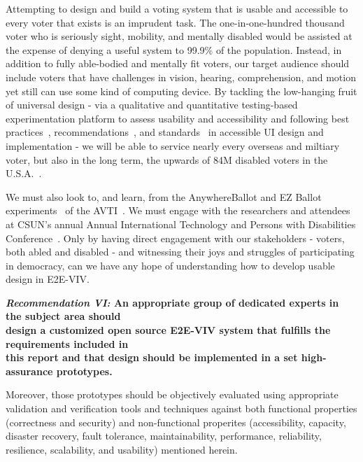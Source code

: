 Attempting to design and build a voting system that is usable and
accessible to every voter that exists is an imprudent task. The
one-in-one-hundred thousand voter who is seriously sight, mobility, and
mentally disabled would be assisted at the expense of 
denying a useful system to 99.9\% of the population. 
Instead, in addition to fully
able-bodied and mentally fit voters, our target audience should include voters that have challenges in
vision, hearing, comprehension, and motion yet still can use some
kind of computing device. By tackling the low-hanging fruit of
universal design - via a qualitative and quantitative testing-based
experimentation platform to assess usability and accessibility and
following best practices~\cite{materials-at-elections.itif.org},
recommendations~\cite{WAI,Section508,WAVE}, and
standards~\cite{standards} in accessible UI design and
implementation - we will be able to service nearly every
overseas and miltiary voter, but also in the long term, the upwards of 84M disabled
voters in the U.S.A.~\cite{Brennen,CensusData}. 

We must also look to, and learn, from the AnywhereBallot and
EZ Ballot experiments~\cite{AnywhereBallot,EZBallot} of the
AVTI~\cite{AVTI}.  We must engage with the researchers and attendees
at CSUN's annual Annual International Technology and Persons with
Disabilities Conference~\cite{CSUN}. Only by having direct engagement
with our stakeholders - voters, both abled and disabled - and
witnessing their joys and struggles of participating in democracy, can
we have any hope of understanding how to develop usable design in
E2E-VIV.

\begin{center}
  \textbf{\emph{Recommendation VI:} An appropriate group of dedicated
    experts in the subject area should\\
    design a customized open source E2E-VIV system that fulfills the
    requirements included in\\
    this report and that design should be implemented in a set
    high-assurance prototypes.}
\end{center}

Moreover, those prototypes should be objectively evaluated using
appropriate validation and verification tools and techniques against
both functional properties (correctness and security) and
non-functional properites (accessibility, capacity, disaster recovery,
fault tolerance, maintainability, performance, reliability,
resilience, scalability, and usability) mentioned herein.

